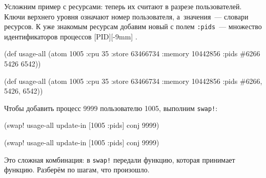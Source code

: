 
Усложним пример с ресурсами: теперь их считают в разрезе пользователей. Ключи
верхнего уровня означают номер пользователя, а~значения~--- словари ресурсов. К
уже знакомым ресурсам добавим новый с полем \verb|:pids|~--- множество
идентификаторов процессов [PID][-9mm]
.

\ifnarrow
\begin{english}
  \begin{clojure/lines}
(def usage-all
  (atom {1005 {:cpu 35
               :store 63466734
               :memory 10442856
               :pids #{6266 5426
                       6542}}}))
  \end{clojure/lines}
\end{english}

\else

\begin{english}
  \begin{clojure/lines}
(def usage-all
  (atom {1005 {:cpu 35
               :store 63466734
               :memory 10442856
               :pids #{6266, 5426, 6542}}}))
  \end{clojure/lines}
\end{english}
\fi

Чтобы добавить процесс 9999 пользователю 1005, выполним \verb|swap!|:

\ifnarrow

\begin{english}
  \begin{clojure}
(swap! usage-all
  update-in [1005 :pids] conj 9999)
  \end{clojure}
\end{english}

\else

\begin{english}
  \begin{clojure}
(swap! usage-all update-in [1005 :pids] conj 9999)
  \end{clojure}
\end{english}

\fi

Это сложная комбинация: в \verb|swap!| передали функцию, которая принимает
функцию. Разберём по шагам, что произошло.

